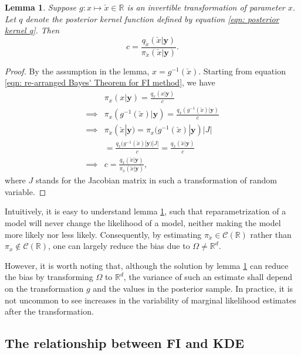 \documentclass[%
 reprint,
 amsmath,amssymb,
 aps,
]{revtex4-2}
\newtheorem{lemma}[theorem]{Lemma}
\def\R{\mathbb{R}}
\def\ybold{\mathbf{y}}
\begin{document}
\begin{lemma} \label{lemma: FI transforming the re-arranged Bayes theorem}
    Suppose $g: x \mapsto \check{x} \in \R$ is an invertible transformation of parameter $x$. Let $q$ denote the posterior kernel function defined by equation \eqref{eqn: posterior kernel q}. Then
    \begin{equation*}
        c = \frac{q_{\check{x}}(\check{x}|\ybold)}{\pi_{\check{x}}(\check{x}|\ybold)}.
    \end{equation*}
\end{lemma}
\begin{proof}
    By the assumption in the lemma, $x = g^{-1}(\check{x})$. Starting from equation \eqref{eqn: re-arranged Bayes' Theorem for FI method}, we have
    \begin{align*}
        & \pi_x(x|\ybold) = \frac{q_x(x|\ybold)}{c} \\
        \implies & \pi_x(g^{-1}(\check{x})|\ybold) = \frac{q_x(g^{-1}(\check{x})|\ybold)}{c} \\
        \implies & \pi_{\check{x}}(\check{x}|\ybold) = \pi_x(g^{-1}(\check{x})|\ybold)|J| \\
        & = \frac{q_x(g^{-1}(\check{x})|\ybold)|J|}{c} = \frac{q_{\check{x}}(\check{x}|\ybold)}{c} \\
        \implies & c = \frac{q_{\check{x}}(\check{x}|\ybold)}{\pi_{\check{x}}(\check{x}|\ybold)},
    \end{align*}
    where $J$ stands for the Jacobian matrix in such a transformation of random variable.
\end{proof}
Intuitively, it is easy to understand lemma \ref{lemma: FI transforming the re-arranged Bayes theorem}, such that reparametrization of a model will never change the likelihood of a model, neither making the model more likely nor less likely. Consequently, by estimating $\pi_{\check{x}} \in \mathcal{C}(\R)$ rather than $\pi_x \notin \mathcal{C}(\R)$, one can largely reduce the bias due to $\Omega \neq \R^d$.

However, it is worth noting that, although the solution by lemma \ref{lemma: FI transforming the re-arranged Bayes theorem} can reduce the bias by transforming $\Omega$ to $\R^d$, the variance of such an estimate shall depend on the transformation $g$ and the values in the posterior sample. In practice, it is not uncommon to see increases in the variability of marginal likelihood estimates after the transformation.

\subsection{\label{subsec:relationship between FI and KDE} The relationship between FI and KDE}
\end{document}
